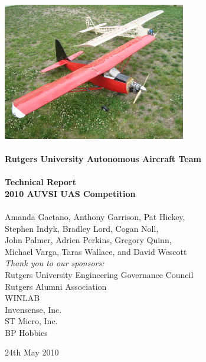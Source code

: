 \begin{titlepage}
\begin{center}

\includegraphics[width=0.6\textwidth]{../images/bothplanes_isometric.jpg}\\[7mm]
\HRule \\[7mm]
{ \huge \bfseries Rutgers University Autonomous Aircraft Team } \\[0.4cm]
\HRule \\[0.4cm]
{ \large \bfseries Technical Report }
\\[0.4cm]
{ \large \bfseries 2010 AUVSI UAS Competition }
\\[0.3cm]
\HRule \\[7mm]

  {\large Amanda Gaetano, Anthony Garrison, Pat Hickey,}
\\{\large Stephen Indyk, Bradley Lord, Cogan Noll,}
\\{\large John Palmer, Adrien Perkins, Gregory Quinn,}
\\{\large Michael Varga, Taras Wallace, and David Wescott}
\\[1cm]
\emph{Thank you to our sponsors:}
\\ Rutgers University Engineering Governance Council
\\ Rutgers Alumni Association
\\ WINLAB
\\ Invensense, Inc.
\\ ST Micro, Inc.
\\ BP Hobbies

\vfill
{\large 24th May 2010}

\end{center}
\end{titlepage}
